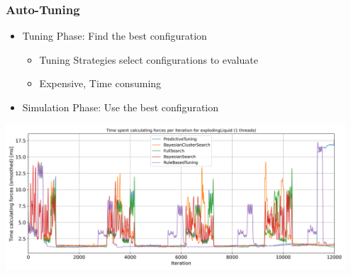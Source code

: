 \documentclass[
	10pt,
	t		%
]{beamer}
\begin{document}
\begin{frame}
	\frametitle{Auto-Tuning }

	\begin{itemize}
		\item Tuning Phase: Find the best configuration
		      \begin{itemize}
			      \item Tuning Strategies select configurations to evaluate
			      \item Expensive, Time consuming
		      \end{itemize}
		\item Simulation Phase: Use the best configuration
	\end{itemize}

	\vspace{0.2cm}

	\begin{center}
		\includegraphics[width=0.95\textwidth,trim={0 0 0 0.85cm},clip]{figures/timing_explodingLiquid.png}
	\end{center}


\end{frame}
\end{document}
